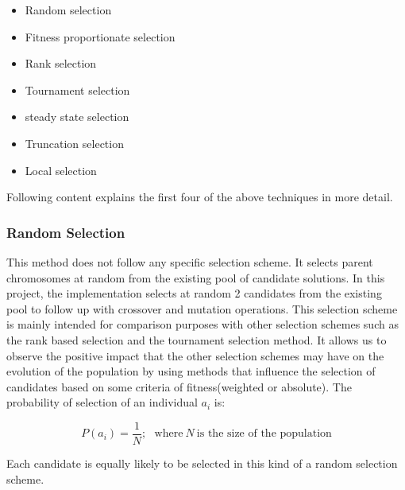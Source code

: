 \documentclass[a4paper, 12pt]{article}
\begin{document}
\begin{itemize}
\item Random selection
\item Fitness proportionate selection
\item Rank selection
\item Tournament selection
\item steady state selection
\item Truncation selection
\item Local selection
\end{itemize}
Following content explains the first four of the above techniques in more detail.
\subsubsection{Random Selection}
This method does not follow any specific selection scheme. It selects parent chromosomes at random from the existing pool of candidate solutions. In this project, the implementation selects at random 2 candidates from the existing pool to follow up with crossover and mutation operations. This selection scheme is mainly intended for comparison purposes with other selection schemes such as the rank based selection and the tournament selection method. It allows us to observe the positive impact that the other selection schemes may have on the evolution of the population by using methods that influence the selection of candidates based on some criteria of fitness(weighted or absolute).
The probability of selection of an individual $a_i$ is:
\begin{large}
\boldmath\begin{equation*}
P\left(a_{i}\right) = \frac{1}{N};\ \ \ \text{where}\ N\ \text{is the size of the population}
\end{equation*}
\end{large}
Each candidate is equally likely to be selected in this kind of a random selection scheme.
\end{document}
